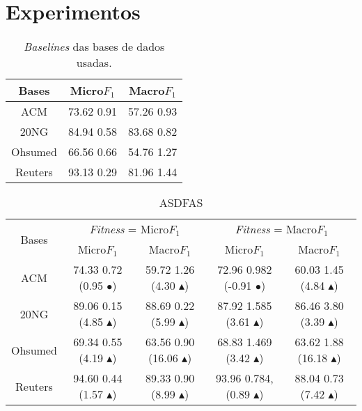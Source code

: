 
\chapter{Experimentos}
\label{cap::experimentos}

\newcommand{\triangOK}{\textcolor[rgb]{00,0.45,0.10}{$\blacktriangle$}}
\newcommand{\triangBAD}{\textcolor[rgb]{0.7,00,00}{$\blacktriangledown$}}
\newcommand{\ball}{\textcolor[rgb]{0.7,0.70,0.0}{$\bullet$}}
 	



\begin{table}
\centering
\begin{footnotesize}
\begin{tabular}{|c||c|c|}
\toprule
\textbf{Bases} & \textbf{Micro$F_1$} & \textbf{Macro$F_1$}\tabularnewline
\midrule
ACM & 73.62 \textpm{} 0.91 & 57.26 \textpm{} 0.93\tabularnewline
\hline 
20NG & 84.94 \textpm{} 0.58 & 83.68 \textpm{} 0.82\tabularnewline
\hline 
Ohsumed & 66.56 \textpm{} 0.66 & 54.76 \textpm{} 1.27\tabularnewline
\hline 
Reuters & 93.13 \textpm{} 0.29 & 81.96 \textpm{} 1.44\tabularnewline
\bottomrule
\end{tabular}
\caption{\textit{Baselines} das bases de dados usadas.}
\label{tab::baselines}
\end{footnotesize}
\end{table}

\begin{table}
\centering
\begin{scriptsize}
\begin{tabular}{|c||c|c|c|c|}
\toprule
 \multirow{2}{*}{Bases} & \multicolumn{2}{c|}{\textit{Fitness} = Micro$F_1$} & \multicolumn{2}{c|}{\textit{Fitness} = Macro$F_1$}\tabularnewline
\cline{2-5}  & Micro$F_1$ & Macro$F_1$ & Micro$F_1$ & Macro$F_1$\tabularnewline
\midrule 
ACM & 74.33 \textpm{} 0.72 (0.95 \ball) & 59.72 \textpm{} 1.26 (4.30 \triangOK) & 72.96 \textpm{} 0.982 (-0.91 \ball) & 60.03 \textpm{} 1.45 (4.84 \triangOK)\tabularnewline
\hline 
20NG & 89.06 \textpm{} 0.15 (4.85 \triangOK) & 88.69 \textpm{} 0.22 (5.99 \triangOK) & 87.92 \textpm{} 1.585 (3.61 \triangOK) & 86.46 \textpm{} 3.80 (3.39 \triangOK)\tabularnewline
\hline 
Ohsumed & 69.34 \textpm{} 0.55 (4.19 \triangOK) & 63.56 \textpm{} 0.90 (16.06 \triangOK) & 68.83 \textpm{} 1.469 (3.42 \triangOK) &  63.62 \textpm{} 1.88 (16.18 \triangOK)\tabularnewline
\hline 
Reuters & 94.60 \textpm{} 0.44 (1.57 \triangOK) & 89.33 \textpm{} 0.90 (8.99 \triangOK) & 93.96 \textpm{} 0.784, (0.89 \triangOK) & 88.04 \textpm{} 0.73 (7.42 \triangOK)\tabularnewline
\bottomrule
\end{tabular}
\caption{ASDFAS}
\label{tab::}
\end{scriptsize}
\end{table}

